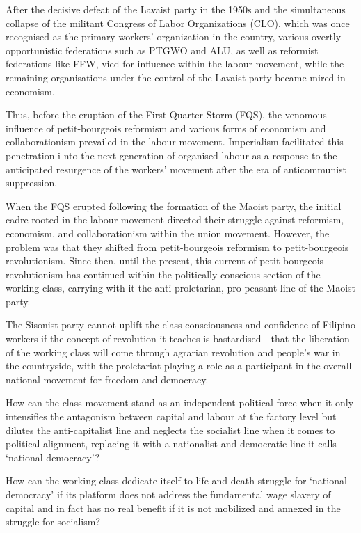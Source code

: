 After the decisive defeat of the Lavaist party in the 1950s 
and the simultaneous collapse 
of the militant Congress of Labor Organizations (CLO), 
which was once recognised as the primary workers' organization in the country, 
various overtly opportunistic federations 
such as PTGWO and ALU, 
as well as reformist federations like FFW, 
vied for influence within the labour movement, 
while the remaining organisations
under the control of the Lavaist party 
became mired in economism.

Thus, 
before the eruption of the First Quarter Storm (FQS), 
the venomous influence of petit-bourgeois reformism 
and various forms of economism and collaborationism 
prevailed in the labour movement. 
Imperialism facilitated this penetration i
nto the next generation of organised labour 
as a response to the anticipated resurgence 
of the workers' movement after the era of anticommunist suppression.

When the FQS erupted following the formation of the Maoist party, 
the initial cadre rooted in the labour movement 
directed their struggle against reformism, economism, and collaborationism 
within the union movement. 
However, 
the problem was that they shifted from petit-bourgeois reformism 
to petit-bourgeois revolutionism. 
Since then, until the present, 
this current of petit-bourgeois revolutionism 
has continued within the politically conscious section of the working class, 
carrying with it the anti-proletarian, pro-peasant line of the Maoist party.

The Sisonist party cannot uplift the class consciousness 
and confidence of Filipino workers 
if the concept of revolution it teaches is bastardised---that 
the liberation of the working class will come 
through agrarian revolution and people's war in the countryside, 
with the proletariat playing a role as a participant 
in the overall national movement for freedom and democracy.

How can the class movement stand 
as an independent political force 
when it only intensifies the antagonism 
between capital and labour at the factory level 
but dilutes the anti-capitalist line 
and neglects the socialist line 
when it comes to political alignment, 
replacing it with a nationalist and democratic line 
it calls `national democracy'?

How can the working class dedicate itself 
to life-and-death struggle for `national democracy' 
if its platform does not address 
the fundamental wage slavery of capital 
and in fact has no real benefit 
if it is not mobilized and annexed 
in the struggle for socialism?

